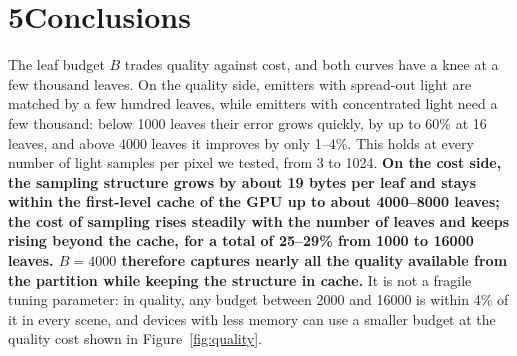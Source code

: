 \documentclass[10pt]{article}
\begin{document}
\section*{5\quad Conclusions}

The leaf budget $B$ trades quality against cost, and both curves have a knee at a few thousand leaves. On the quality side, emitters with spread-out light are matched by a few hundred leaves, while emitters with concentrated light need a few thousand: below 1000 leaves their error grows quickly, by up to 60\% at 16 leaves, and above 4000 leaves it improves by only 1--4\%. This holds at every number of light samples per pixel we tested, from 3 to 1024. \textbf{On the cost side, the sampling structure grows by about 19 bytes per leaf and stays within the first-level cache of the GPU up to about 4000--8000 leaves; the cost of sampling rises steadily with the number of leaves and keeps rising beyond the cache, for a total of 25--29\% from 1000 to 16000 leaves. $B=4000$ therefore captures nearly all the quality available from the partition while keeping the structure in cache.} It is not a fragile tuning parameter: in quality, any budget between 2000 and 16000 is within 4\% of it in every scene, and devices with less memory can use a smaller budget at the quality cost shown in Figure~\ref{fig:quality}.
\end{document}
